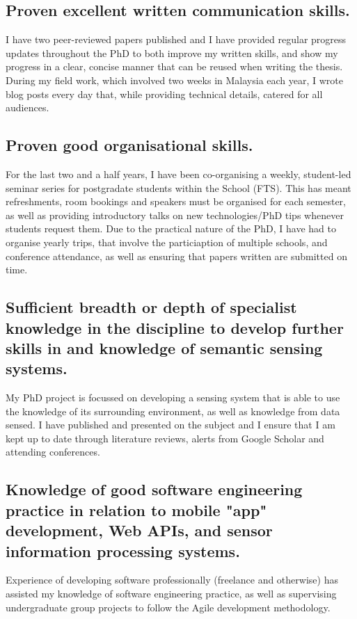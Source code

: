 \documentclass[10pt,a4paper]{article}
\begin{document}
\subsection{Proven excellent written communication skills.}
I have two peer-reviewed papers published and I have provided regular progress updates throughout the PhD to both improve my written skills, and show my progress in a clear, concise manner that can be reused when writing the thesis. During my field work, which involved two weeks in Malaysia each year, I wrote blog posts every day that, while providing technical details, catered for all audiences.

\subsection{Proven good organisational skills.}
For the last two and a half years, I have been co-organising a weekly, student-led seminar series for postgradate students within the School (FTS). This has meant refreshments, room bookings and speakers must be organised for each semester, as well as providing introductory talks on new technologies/PhD tips whenever students request them. Due to the practical nature of the PhD, I have had to organise yearly trips, that involve the particiaption of multiple schools, and conference attendance, as well as ensuring that papers written are submitted on time.

\subsection{Sufficient breadth or depth of specialist knowledge in the discipline to develop further skills in and knowledge of semantic sensing systems.}
My PhD project is focussed on developing a sensing system that is able to use the knowledge of its surrounding environment, as well as knowledge from data sensed. I have published and presented on the subject and I ensure that I am kept up to date through literature reviews, alerts from Google Scholar and attending conferences.

\subsection{Knowledge of good software engineering practice in relation to mobile "app" development, Web APIs, and sensor information processing systems.}
Experience of developing software professionally (freelance and otherwise) has assisted my knowledge of software engineering practice, as well as supervising undergraduate group projects to follow the Agile development methodology. 
\end{document}
